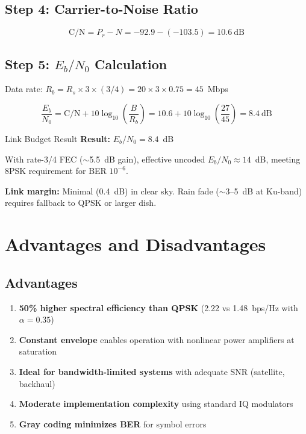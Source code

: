 \subsection*{Step 4: Carrier-to-Noise Ratio}

\begin{equation}
\mathrm{C/N} = P_r - N = -92.9 - (-103.5) = 10.6~\text{dB}
\end{equation}

\subsection*{Step 5: $E_b/N_0$ Calculation}

Data rate: $R_b = R_s \times 3 \times (3/4) = 20 \times 3 \times 0.75 = 45$~Mbps

\begin{equation}
\frac{E_b}{N_0} = \mathrm{C/N} + 10\log_{10}\left(\frac{B}{R_b}\right) = 10.6 + 10\log_{10}\left(\frac{27}{45}\right) = 8.4~\text{dB}
\end{equation}

\begin{calloutbox}[colback=black!8!white,colframe=black]{Link Budget Result}
\textbf{Result:} $E_b/N_0 = 8.4$~dB

With rate-3/4 FEC ($\sim$5.5~dB gain), effective uncoded $E_b/N_0 \approx 14$~dB, meeting 8PSK requirement for BER $10^{-6}$.

\textbf{Link margin:} Minimal (0.4~dB) in clear sky. Rain fade ($\sim$3--5~dB at Ku-band) requires fallback to QPSK or larger dish.
\end{calloutbox}

\section{Advantages and Disadvantages}

\subsection*{Advantages}

\begin{enumerate}
\item \textbf{50\% higher spectral efficiency than QPSK} (2.22 vs 1.48~bps/Hz with $\alpha = 0.35$)
\item \textbf{Constant envelope} enables operation with nonlinear power amplifiers at saturation
\item \textbf{Ideal for bandwidth-limited systems} with adequate SNR (satellite, backhaul)
\item \textbf{Moderate implementation complexity} using standard IQ modulators
\item \textbf{Gray coding minimizes BER} for symbol errors
\end{enumerate}

